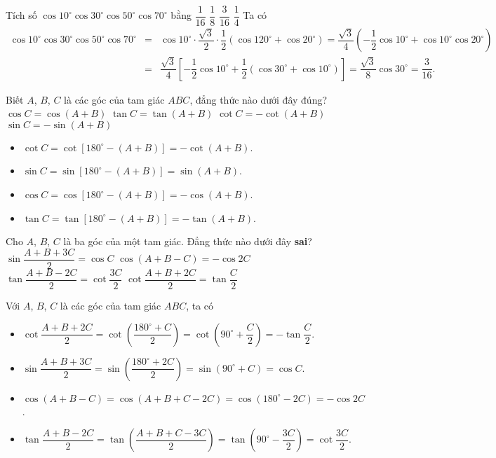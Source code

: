\begin{ex}%
Tích số $\cos 10^\circ\cos 30^\circ \cos 50^\circ  \cos 70^\circ$ bằng
\choice
{$\dfrac{1}{16}$}
{$\dfrac{1}{8}$}
{\True $\dfrac{3}{16}$}
{$\dfrac{1}{4}$}
\loigiai
{
Ta có
\allowdisplaybreaks
\begin{eqnarray*}
\cos 10^\circ\cos 30^\circ \cos 50^\circ  \cos 70^\circ &=& \cos 10^\circ\cdot \dfrac{\sqrt{3}}{2}\cdot \dfrac{1}{2}\left(\cos 120^\circ+\cos 20^\circ\right) = \dfrac{\sqrt{3}}{4}\left(-\dfrac{1}{2}\cos 10^\circ + \cos 10^\circ\cos 20^\circ\right)\\
&=& \dfrac{\sqrt{3}}{4}\left[-\dfrac{1}{2}\cos 10^\circ +\dfrac{1}{2}\left(\cos 30^\circ + \cos 10^\circ\right)\right] = \dfrac{\sqrt{3}}{8}\cos 30^\circ = \dfrac{3}{16}.
\end{eqnarray*}
}
\end{ex}

\begin{ex}%
Biết $A$, $B$, $C$ là các góc của tam giác $ABC$, đẳng thức nào dưới đây đúng?
\choice
{$\cos C=\cos (A+B)$}
{$\tan C=\tan (A+B)$}
{\True $\cot C=-\cot (A+B)$}
{$\sin C=-\sin (A+B)$}
\loigiai
{
\begin{itemize}
\item $\cot C= \cot\left[180^\circ-(A+B)\right] = -\cot(A+B)$.
\item $\sin C= \sin\left[180^\circ-(A+B)\right] = \sin(A+B)$.
\item $\cos C= \cos\left[180^\circ-(A+B)\right] = -\cos(A+B)$.
\item $\tan C= \tan\left[180^\circ-(A+B)\right] = -\tan(A+B)$.
\end{itemize}
}
\end{ex}

\begin{ex}%
Cho $A$, $B$, $C$ là ba góc của một tam giác. Đẳng thức nào dưới đây \textbf{sai}?
\choice
{$\sin \dfrac{A+B+3C}{2}=\cos C$}
{$\cos (A+B-C)=-\cos 2C$}
{$\tan \dfrac{A+B-2C}{2}=\cot \dfrac{3C}{2}$}
{\True $\cot \dfrac{A+B+2C}{2}=\tan \dfrac{C}{2}$}
\loigiai
{
Với $A$, $B$, $C$ là các góc của tam giác $ABC$, ta có
\begin{itemize}
\item $\cot \dfrac{A+B+2C}{2} = \cot\left(\dfrac{180^\circ+C}{2}\right) = \cot\left(90^\circ+\dfrac{C}{2}\right)=-\tan \dfrac{C}{2}$.
\item $\sin \dfrac{A+B+3C}{2} = \sin\left(\dfrac{180^\circ+2C}{2}\right) = \sin\left(90^\circ+C\right)=\cos C$.
\item $\cos(A+B-C)=\cos(A+B+C-2C) = \cos\left(180^\circ-2C\right)=-\cos 2C$.
\item $\tan \dfrac{A+B-2C}{2}=\tan\left(\dfrac{A+B+C-3C}{2}\right) = \tan\left(90^\circ-\dfrac{3C}{2}\right)=\cot \dfrac{3C}{2}$.
\end{itemize}
}
\end{ex}

